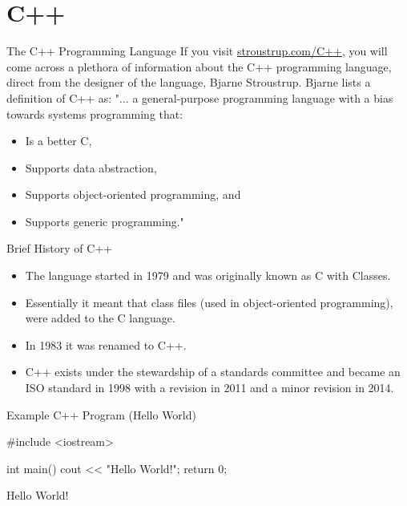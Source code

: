 \documentclass[../lecture1-introduction.tex]{subfiles}
\begin{document}
\section{C++}


\begin{frame}[fragile]{The C++ Programming Language}
    If you visit \href{http://www.stroustrup.com/C++.html}{stroustrup.com/C++},
    you will come across a plethora of information about the C++ programming
    language, direct from the designer of the language, Bjarne Stroustrup. \newline
    \newline
    Bjarne lists a definition of C++ as: \newline \newline
    "... a general-purpose programming language with a bias towards systems
    programming that:
    \begin{itemize}
        \item Is a better C,
        \item Supports data abstraction,
        \item Supports object-oriented programming, and
        \item Supports generic programming."
    \end{itemize}
\end{frame}


\begin{frame}[fragile]{Brief History of C++}
    \begin{itemize} \pause
        \item The language started in 1979 and was originally known as C with Classes. \pause
        \item Essentially it meant that class files (used in object-oriented
        programming), were added to the C language. \pause
        \item In 1983 it was renamed to C++. \pause
        \item C++ exists under the stewardship of a standards committee and
        became an ISO standard in 1998 with a revision in 2011 and a minor
        revision in 2014. \pause
    \end{itemize}
\end{frame}


\begin{frame}[fragile]{Example C++ Program (Hello World)}
    \begin{cppcode}[]
#include <iostream>

int main()
{
    cout << "Hello World!";
    return 0;
}
    \end{cppcode}

    \begin{commandshell}
Hello World!
    \end{commandshell}
\end{frame}

\end{document}
